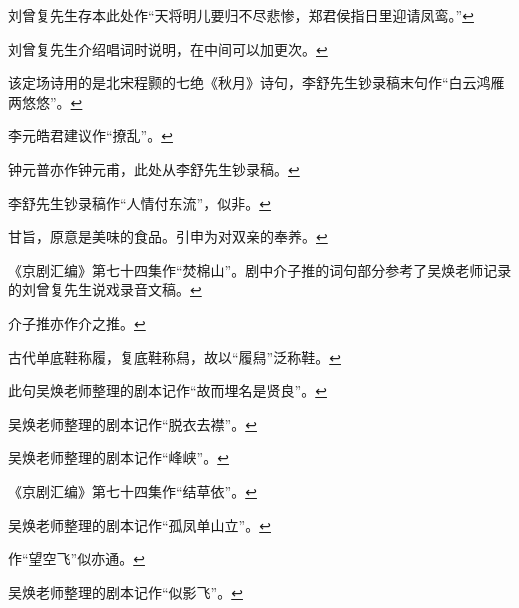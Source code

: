   \leavevmode\hypertarget{fn29}{}%
  刘曾复先生存本此处作``天将明儿要归不尽悲惨，郑君侯指日里迎请凤鸾。''\protect\hyperlink{fnref29}{↩}
\item
  \leavevmode\hypertarget{fn30}{}%
  刘曾复先生介绍唱词时说明，在中间可以加更次。\protect\hyperlink{fnref30}{↩}
\item
  \leavevmode\hypertarget{fn31}{}%
  该定场诗用的是北宋程颢的七绝《秋月》诗句，李舒先生钞录稿末句作``白云鸿雁两悠悠''。\protect\hyperlink{fnref31}{↩}
\item
  \leavevmode\hypertarget{fn32}{}%
  李元皓君建议作``撩乱''。\protect\hyperlink{fnref32}{↩}
\item
  \leavevmode\hypertarget{fn33}{}%
  钟元普亦作钟元甫，此处从李舒先生钞录稿。\protect\hyperlink{fnref33}{↩}
\item
  \leavevmode\hypertarget{fn34}{}%
  李舒先生钞录稿作``人情付东流''，似非。\protect\hyperlink{fnref34}{↩}
\item
  \leavevmode\hypertarget{fn35}{}%
  甘旨，原意是美味的食品。引申为对双亲的奉养。\protect\hyperlink{fnref35}{↩}
\item
  \leavevmode\hypertarget{fn36}{}%
  《京剧汇编》第七十四集作``焚棉山''。剧中介子推的词句部分参考了吴焕老师记录的刘曾复先生说戏录音文稿。\protect\hyperlink{fnref36}{↩}
\item
  \leavevmode\hypertarget{fn37}{}%
  介子推亦作介之推。\protect\hyperlink{fnref37}{↩}
\item
  \leavevmode\hypertarget{fn38}{}%
  古代单底鞋称履，复底鞋称舄，故以``履舄''泛称鞋。\protect\hyperlink{fnref38}{↩}
\item
  \leavevmode\hypertarget{fn39}{}%
  此句吴焕老师整理的剧本记作``故而埋名是贤良''。\protect\hyperlink{fnref39}{↩}
\item
  \leavevmode\hypertarget{fn40}{}%
  吴焕老师整理的剧本记作``脱衣去襟''。\protect\hyperlink{fnref40}{↩}
\item
  \leavevmode\hypertarget{fn41}{}%
  吴焕老师整理的剧本记作``峰峡''。\protect\hyperlink{fnref41}{↩}
\item
  \leavevmode\hypertarget{fn42}{}%
  《京剧汇编》第七十四集作``结草依''。\protect\hyperlink{fnref42}{↩}
\item
  \leavevmode\hypertarget{fn43}{}%
  吴焕老师整理的剧本记作``孤凤单山立''。\protect\hyperlink{fnref43}{↩}
\item
  \leavevmode\hypertarget{fn44}{}%
  作``望空飞''似亦通。\protect\hyperlink{fnref44}{↩}
\item
  \leavevmode\hypertarget{fn45}{}%
  吴焕老师整理的剧本记作``似影飞''。\protect\hyperlink{fnref45}{↩}
